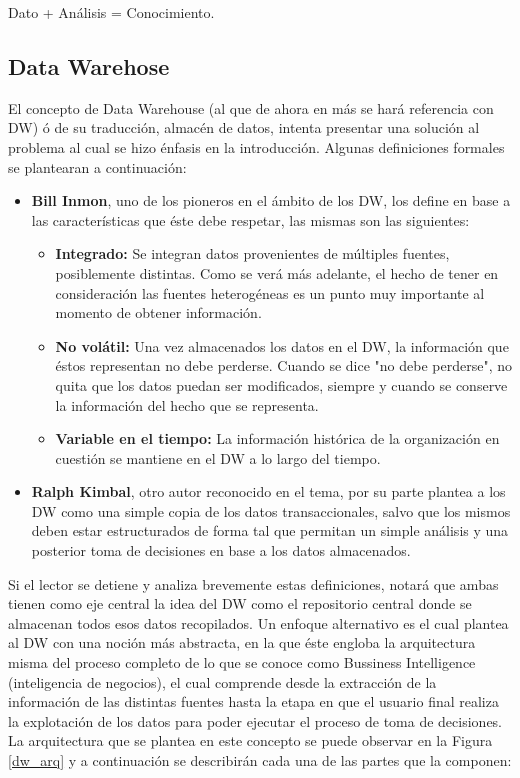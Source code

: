 \documentclass[a4paper,11pt]{article}
\begin{document}
\begin{flushleft}
    \vspace{0.1in}
    \begin{center}
      Dato + Análisis = Conocimiento.
    \end{center}


    \subsection{Data Warehose}
    
    El concepto de Data Warehouse (al que de ahora en más se hará referencia con DW) ó de su traducción, almacén de datos, intenta presentar una solución
    al problema al cual se hizo énfasis en la introducción. Algunas definiciones formales se plantearan a continuación:

    \begin{itemize}
      \item \textbf{Bill Inmon}, uno de los pioneros en el ámbito de los DW, los define en base a las características que éste debe respetar, las mismas son
      las siguientes:
      \begin{itemize}
        \item \textbf{Integrado:} Se integran datos provenientes de múltiples fuentes, posiblemente distintas. Como se verá más adelante, el hecho de tener
        en consideración las fuentes heterogéneas es un punto muy importante al momento de obtener información.
        \item \textbf{No volátil:} Una vez almacenados los datos en el DW, la información que éstos representan no debe perderse. Cuando se dice
        "no debe perderse", no quita que los datos puedan ser modificados, siempre y cuando se conserve la información del hecho que se representa.
        \item \textbf{Variable en el tiempo:} La información histórica de la organización en cuestión se mantiene en el DW a lo largo del tiempo.
      \end{itemize}
      \item \textbf{Ralph Kimbal}, otro autor reconocido en el tema, por su parte plantea a los DW como una simple copia de los datos transaccionales,
      salvo que los mismos deben estar estructurados de forma tal que permitan un simple análisis y una posterior toma de decisiones en base a los
      datos almacenados.
    \end{itemize}
    
    Si el lector se detiene y analiza brevemente estas definiciones, notará que ambas tienen como eje central la idea del DW como el repositorio central
    donde se almacenan todos esos datos recopilados. Un enfoque alternativo es el cual plantea al DW con una noción más abstracta, en la que éste engloba
    la arquitectura misma del proceso completo de lo que se conoce como Bussiness Intelligence (inteligencia de negocios), el cual comprende desde la
    extracción de la información de las distintas fuentes hasta la etapa en que el usuario final realiza la explotación de los datos para poder ejecutar el
    proceso de toma de decisiones. La arquitectura que se plantea en este concepto se puede observar en la Figura \ref{dw_arq} y a continuación se describirán cada
    una de las partes que la componen:


\end{flushleft}
\end{document}
